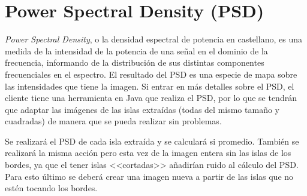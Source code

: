 \section{Power Spectral Density (PSD)}

\textit{Power Spectral Density}, o la densidad espectral de potencia en castellano, es una medida de la intensidad de la potencia de una se\~{n}al en el dominio de la frecuencia, informando de la distribuci\'{o}n de sus distintas componentes frecuenciales en el espectro. El resultado del PSD es una especie de mapa sobre las intensidades que tiene la imagen. Si entrar en m\'{a}s detalles sobre el PSD, el cliente tiene una herramienta en Java que realiza el PSD, por lo que se tendr\'{a}n que adaptar las im\'{a}genes de las islas extra\'{i}das (todas del mismo tama\~{n}o y cuadradas) de manera que se pueda realizar sin problemas.

Se realizar\'{a} el PSD de cada isla extra\'{i}da y se calcular\'{a} si promedio. Tambi\'{e}n se realizar\'{a} la misma acci\'{o}n pero esta vez de la imagen entera sin las islas de los bordes, ya que el tener islas <<cortadas>> a\~{n}adir\'{i}an ruido al c\'{a}lculo del PSD. Para esto \'{u}ltimo se deber\'{a} crear una imagen nueva a partir de las islas que no est\'{e}n tocando los bordes.

